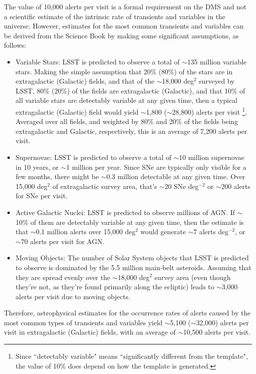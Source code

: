 \documentclass[DM,lsstdraft,authoryear,toc]{lsstdoc}
\begin{document}
The value of 10,000 alerts per visit is a formal requirement on the DMS and not a scientific estimate of the intrinsic rate of transients and variables in the universe. However, estimates for the most common transients and variables can be derived from the Science Book \citep{2009arXiv0912.0201L} by making some significant assumptions, as follows:
\begin{itemize}
\item Variable Stars: LSST is predicted to observe a total of $\sim$135 million variable stars. Making the simple assumption that 20\% (80\%) of the stars are in extragalactic (Galactic) fields, and that of the $\sim$18,000 deg$^2$ surveyed by LSST, 80\% (20\%) of the fields are extragalactic (Galactic), and that 10\% of all variable stars are detectably variable at any given time, then a typical extragalactic (Galactic) field would yield $\sim$1,800 ($\sim$28,800) alerts per visit \footnote{Since ``detectably variable" means ``significantly different from the template", the value of 10\% does depend on how the template is generated.}. Averaged over all fields, and weighted by 80\% and 20\% of the fields being extragalactic and Galactic, respectively, this is an average of 7,200 alerts per visit.
\item Supernovae: LSST is predicted to observe a total of $\sim$10 million supernovae in 10 years, or $\sim$1 million per year. Since SNe are typically only visible for a few months, there might be $\sim$0.3 million detectable at any given time. Over 15,000 deg$^{2}$ of extragalactic survey area, that's $\sim$20 SNe deg$^{-2}$ or $\sim$200 alerts for SNe per visit.
\item Active Galactic Nuclei: LSST is predicted to observe millions of AGN. If $\sim$10\% of them are detectably variable at any given time, then the estimate is that $\sim$0.1 million alerts over 15,000 deg$^2$ would generate $\sim$7 alerts deg$^{-2}$, or $\sim$70 alerts per visit for AGN.
\item Moving Objects: The number of Solar System objects that LSST is predicted to observe is dominated by the 5.5 million main-belt asteroids. Assuming that they are spread evenly over the $\sim$18,000 deg$^2$ survey area (even though they're not, as they're found primarily along the ecliptic) leads to $\sim$3,000 alerts per visit due to moving objects.
\end{itemize} 
Therefore, astrophysical estimates for the occurrence rates of alerts caused by the most common types of transients and variables yield $\sim$5,100 ($\sim$32,000) alerts per visit in extragalactic (Galactic) fields, with an average of $\sim$10,500 alerts per visit.
\end{document}
